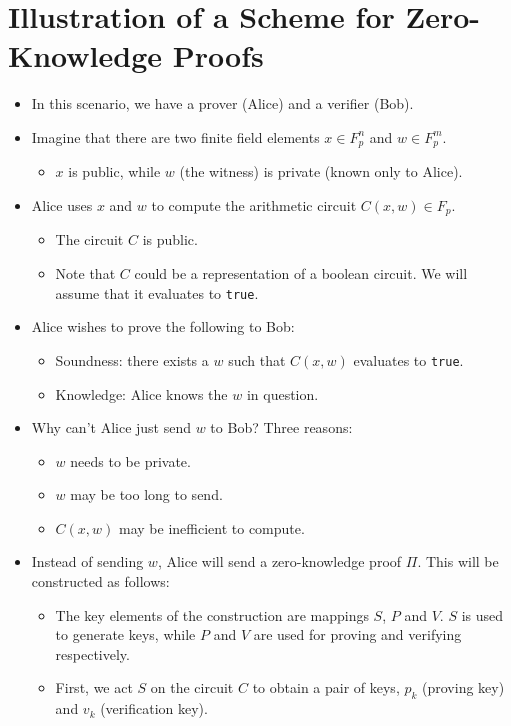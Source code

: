 \documentclass[twoside]{article}
\begin{document}
\section{Illustration of a Scheme for Zero-Knowledge Proofs}
\begin{itemize}
\item In this scenario, we have a prover (Alice) and a verifier (Bob).
\item Imagine that there are two finite field elements $x\in F_p^n$ and $w \in F_p^m$.
	\begin{itemize}
	\item $x$ is public, while $w$ (the witness) is private (known only to Alice).
	\end{itemize}
\item Alice uses $x$ and $w$ to compute the arithmetic circuit $C(x, w) \in F_p$.
	\begin{itemize}
	\item The circuit $C$ is public.
	\item Note that $C$ could be a representation of a boolean circuit. We will assume that it evaluates to \texttt{true}.
	\end{itemize}
\item Alice wishes to prove the following to Bob:
	\begin{itemize}
	\item Soundness: there exists a $w$ such that $C(x, w)$ evaluates to \texttt{true}.
	\item Knowledge: Alice knows the $w$ in question.
	\end{itemize}
\item Why can't Alice just send $w$ to Bob? Three reasons:
	\begin{itemize}
	\item $w$ needs to be private.
	\item $w$ may be too long to send.
	\item $C(x, w)$ may be inefficient to compute.
	\end{itemize}
\item Instead of sending $w$, Alice will send a zero-knowledge proof $\Pi$. This will be constructed as follows:
	\begin{itemize}
	\item The key elements of the construction are mappings $S$, $P$ and $V$. $S$ is used to generate keys, while $P$ and $V$ are used for proving and verifying respectively.
	\item First, we act $S$ on the circuit $C$ to obtain a pair of keys, $p_k$ (proving key) and $v_k$ (verification key).

\end{itemize}
\end{itemize}
\end{document}
